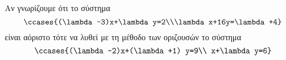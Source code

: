 Αν γνωρίζουμε ότι το σύστημα
\[ \ccases{(\lambda-3)x+\lambda y=2\\\lambda x+16y=\lambda+4} \]
είναι αόριστο τότε να λυθεί με τη μέθοδο των οριζουσών το σύστημα
\[ \ccases{(\lambda-2)x+(\lambda+1) y=9\\ x+\lambda y=6} \]
